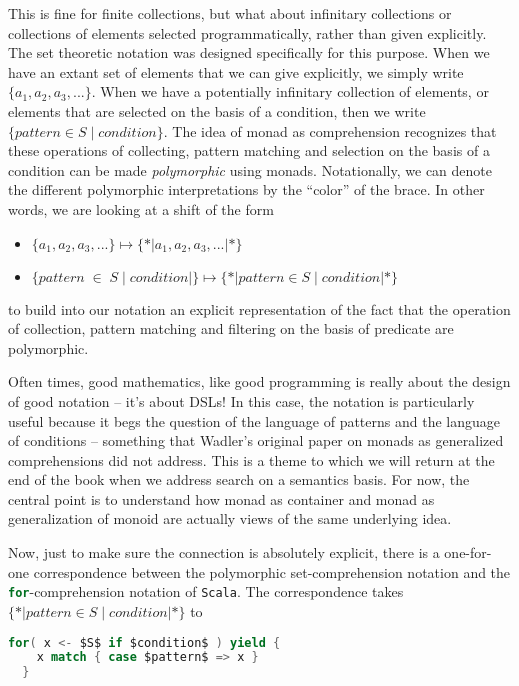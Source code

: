 This is fine for finite collections, but what about infinitary
collections or collections of elements selected programmatically,
rather than given explicitly. The set theoretic notation was designed
specifically for this purpose. When we have an extant set of elements
that we can give explicitly, we simply write $\{ a_1, a_2, a_3, ... \}$.
When we have a potentially infinitary collection of elements, or
elements that are selected on the basis of a condition, then we write
$\{ pattern \in S \; | \; condition \}$. The idea of monad as comprehension
recognizes that these operations of collecting, pattern matching and
selection on the basis of a condition can be made \emph{polymorphic}
using monads. Notationally, we can denote the different polymorphic
interpretations by the ``color'' of the brace. In other words, we are
looking at a shift of the form
\begin{itemize}
  \item $\{ a_1, a_2, a_3, ... \} \mapsto \{*| a_1, a_2, a_3, ... |*\}$
  \item $\{ pattern \; \in \; S \;|\; condition |\} \mapsto \{*| pattern \in S \; | \; condition |*\}$
\end{itemize}
to build into our notation an explicit representation of the fact that
the operation of collection, pattern matching and filtering on the
basis of predicate are polymorphic.

Often times, good mathematics, like good programming is really about
the design of good notation -- it's about DSLs! In this case, the
notation is particularly useful because it begs the question of the
language of patterns and the language of conditions -- something that
Wadler's original paper on monads as generalized comprehensions did
not address. This is a theme to which we will return at the end of the
book when we address search on a semantics basis. For now, the central
point is to understand how monad as container and monad as
generalization of monoid are actually views of the same underlying
idea.

Now, just to make sure the connection is absolutely explicit, there is
a one-for-one correspondence between the polymorphic set-comprehension
notation and the \lstinline[language=Scala]!for!-comprehension
notation of \texttt{Scala}. The correspondence takes
$\{*| pattern \in S \; | \; condition |*\}$ to

\begin{lstlisting}[language=Scala,mathescape=true]
  for( x <- $S$ if $condition$ ) yield {
    x match { case $pattern$ => x }
  }
\end{lstlisting}

